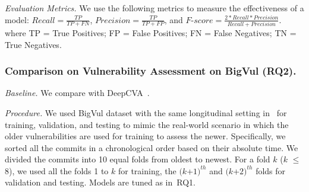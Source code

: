 \emph{Evaluation Metrics.} We use the following metrics to measure the
effectiveness of a model: $Recall = \frac{TP}{TP+FN}$, $Precision =
\frac{TP}{TP+FP}$, and $F$-$score =
\frac{2*Recall*Precision}{Recall+Precision}$.
where TP = True Positives; FP = False Positives; FN = False Negatives; TN = True Negatives.


\subsubsection{Comparison on Vulnerability Assessment on BigVul (RQ2).~\\}

{\em Baseline.} We compare {\tool} with DeepCVA~\cite{deepCVA-ase21}.


{\em Procedure.} We used BigVul dataset with the same
longitudinal setting in~\cite{deepCVA-ase21,falessi2020need} for
training, validation, and testing to mimic the real-world scenario in
which the older vulnerabilities are used for training to assess the
newer. Specifically, we sorted all the commits in a chronological
order based on their absolute time. We divided the commits into 10
equal folds from oldest to newest. For a fold $k$ ($k$ $\le$ $8$), we
used all the folds 1 to $k$ for training, the $(k$+$1)^{th}$ and
$(k$+$2)^{th}$ folds for validation and testing. Models are tuned as
in~RQ1.



